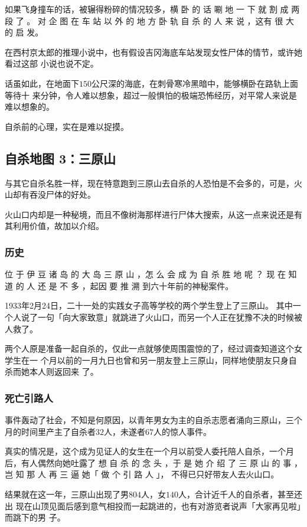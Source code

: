 \documentclass[UTF8]{ctexart}
\begin{document}
如果飞身撞车的话，被辗得粉碎的情况较多，横 卧 的 话 唰 地 一 下 就 割 成 两 段 了 。
对 企 图 在 车 站 以 外 的 地 方 卧 轨 自 杀 的 人 来 说 ，这有 很 大 的 启 发。

在西村京太郎的推理小说中，也有假设吉冈海底车站发现女性尸体的情节，或许她看过这部
小说也说不定。

话虽如此，在地面下$150$公尺深的海底，在刺骨寒冷黑暗中，能够横卧在路轨上面等待十
来分钟，令人难以想象，超过一般惧怕的极端恐怖经历，对平常人来说是难以想象的。

自杀前的心理，实在是难以捉摸。


\subsection{自杀地图 3：三原山}

与其它自杀名胜一样，现在特意跑到三原山去自杀的人恐怕是不会多的，可是，火山却有吞没尸体的好处。

火山口内却是一种秘境，而且不像树海那样进行尸体大搜索，从这一点来说还是有其利用价值，故加以介绍。

\subsubsection{历史}

位 于 伊 豆 诸 岛 的 大 岛 三 原 山 ，怎 么 会 成 为 自 杀 胜 地 呢 ？ 现 在 知 道 的 人 还 是 不 多 ，起因 要 推 溯 到六十年前的神秘案件。

1933年2月24日，二十一处的实践女子高等学校的两个学生登上了三原山。
其中一个人说了一句「向大家致意」就跳进了火山口，而另一个人正在犹豫不决的时候被人救了。

两个人原是准备一起自杀的，仅此一点就够使周围震惊的了，经过调查知道这个女学生在一
个月以前的一月九日也曾和另一朋友登上三原山，同样地使朋友只身自杀而她本人则返回来
了。

\subsubsection{死亡引路人}

事件轰动了社会，不知是何原因，以青年男女为主的自杀志愿者涌向三原山，三个月的时间里产主了自杀者$32$人，未遂者$67$人的惊人事件。

真实的情况是，这个成为见证人的女生在一个月以前受人委托陪人自杀，一个月后，有人偶然向她吐露了 想 自 杀 的 念 头 ，于 是 她 介 绍 了 三 原 山 的 事 ，岂 知 那 人 再 三 逼 她「 做 个 引 路 人 」， 不得已只好带友人去火山口。

结果就在这一年，三原山出现了男$804$人，女$140$人，合计近千人的自杀者，甚至还出 现在山顶见面后感到意气相投而一起跳进的，也有对游览者说声「大家再见啦」而跳下的男 子。
\end{document}
